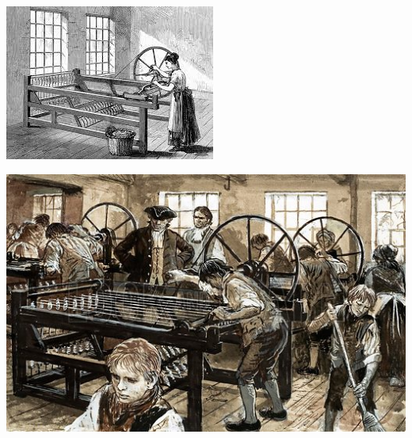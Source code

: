 \vfill
\pagebreak

\begin{center}
	\includegraphics[height=.9\textheight]{./IMG/spinninjenny.jpeg}
\end{center}


\vfill
\pagebreak

\begin{center}
	\includegraphics[height=.9\textheight]{./IMG/A003171.jpg}
\end{center}

\vfill
\pagebreak


